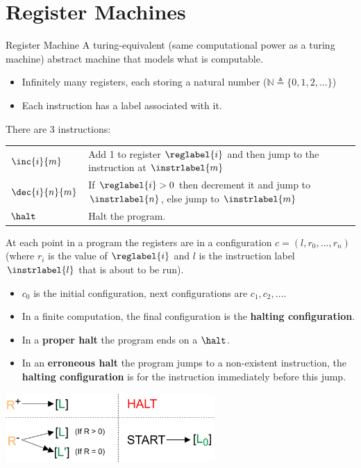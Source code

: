 \section{Register Machines}

\begin{definitionbox}{Register Machine}
	A turing-equivalent (same computational power as a turing machine) abstract machine that models what is computable.
	\begin{itemize}
		\item Infinitely many registers, each storing a natural number ($\mathbb{N} \triangleq \{0, 1, 2, \dots\}$)
		\item Each instruction has a label associated with it.
    \end{itemize}
    There are 3 instructions:
    \begin{center}
        \begin{tabular}{l l}
            $\inc{i}{m}$    & Add 1 to register $\reglabel{i}$ and then jump to the instruction at $\instrlabel{m}$               \\
            $\dec{i}{n}{m}$ & If $\reglabel{i} > 0$ then decrement it and jump to $\instrlabel{n}$, else jump to $\instrlabel{m}$ \\
            $\halt$         & Halt the program.
        \end{tabular}
    \end{center}
	At each point in a program the registers are in a configuration $c = (l, r_0, \dots, r_n)$ (where $r_i$ is the value of $\reglabel{i}$ and $l$ is the instruction label $\instrlabel{l}$ that is about to be run).
	\begin{itemize}
		\item $c_0$ is the initial configuration, next configurations are $c_1, c_2, \dots$.
		\item In a finite computation, the final configuration is the \textbf{halting configuration}.
		\item In a \textbf{proper halt} the program ends on a $\halt$.
		\item In an \textbf{erroneous halt} the program jumps to a non-existent instruction, the \textbf{halting configuration} is for the instruction immediately before this jump.
    \end{itemize}
    \begin{center}
        \includegraphics[width=0.6\textwidth]{register_machines/images/graphical_register_machine.drawio.png}
    \end{center}
\end{definitionbox}

